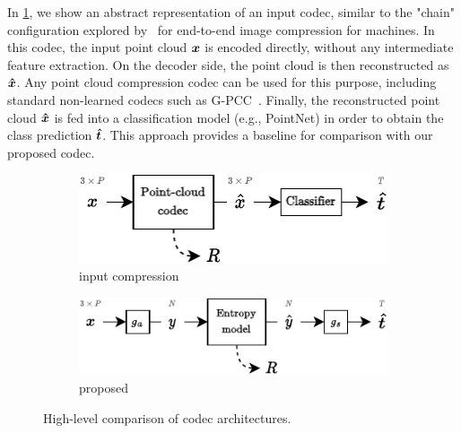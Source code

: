 In \cref{fig:arch-comparison/input-compression}, we show an abstract representation of an input codec, similar to the "chain" configuration explored by~\cite{chamain2020endtoend} for end-to-end image compression for machines.
In this codec, the input point cloud ${\boldsymbol{x}}$ is encoded directly, without any intermediate feature extraction.
On the decoder side, the point cloud is then reconstructed as ${\boldsymbol{\hat{x}}}$.
Any point cloud compression codec can be used for this purpose, including standard non-learned codecs such as G-PCC~\cite{mpeg2019gpccv2}.
Finally, the reconstructed point cloud ${\boldsymbol{\hat{x}}}$ is fed into a classification model (e.g., PointNet) in order to obtain the class prediction ${\boldsymbol{\hat{t}}}$.
This approach provides a baseline for comparison with our proposed codec.

\begin{figure}[tbp]
  \centering
  \begin{subfigure}[b]{0.53\linewidth}
    \centering
    \includegraphics[width=\linewidth]{img/point_cloud_compression/arch/input-compression.pdf}
    \caption{input compression}
    \label{fig:arch-comparison/input-compression}
  \end{subfigure}%
  \vspace{1.5\baselineskip}
  \begin{subfigure}[b]{0.62\linewidth}
    \centering
    \includegraphics[width=\linewidth]{img/point_cloud_compression/arch/proposed.pdf}
    \caption{proposed}
    \label{fig:arch-comparison/proposed}
  \end{subfigure}%
  \caption{High-level comparison of codec architectures.}
  \label{fig:arch-comparison}
\end{figure}



